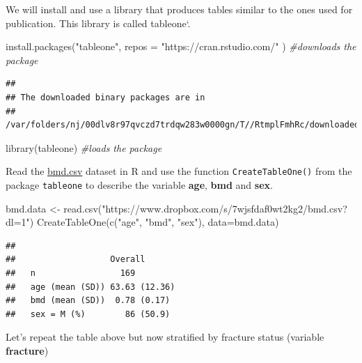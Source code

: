 \documentclass[
]{book}
\newenvironment{Shaded}{\begin{snugshade}}{\end{snugshade}}
\newcommand{\AttributeTok}[1]{\textcolor[rgb]{0.77,0.63,0.00}{#1}}
\newcommand{\CommentTok}[1]{\textcolor[rgb]{0.56,0.35,0.01}{\textit{#1}}}
\newcommand{\FunctionTok}[1]{\textcolor[rgb]{0.00,0.00,0.00}{#1}}
\newcommand{\NormalTok}[1]{#1}
\newcommand{\OtherTok}[1]{\textcolor[rgb]{0.56,0.35,0.01}{#1}}
\newcommand{\StringTok}[1]{\textcolor[rgb]{0.31,0.60,0.02}{#1}}
\begin{document}
We will install and use a library that produces tables similar to the ones used
for publication. This library is called tableone`.

\begin{Shaded}
\begin{Highlighting}[]
\FunctionTok{install.packages}\NormalTok{(}\StringTok{"tableone"}\NormalTok{, }
                 \AttributeTok{repos =} \StringTok{"https://cran.rstudio.com/"}\NormalTok{ ) }\CommentTok{\#downloads the package}
\end{Highlighting}
\end{Shaded}

\begin{verbatim}
## 
## The downloaded binary packages are in
##  /var/folders/nj/00dlv8r97qvczd7trdqw283w0000gn/T//RtmplFmhRc/downloaded_packages
\end{verbatim}

\begin{Shaded}
\begin{Highlighting}[]
\FunctionTok{library}\NormalTok{(tableone)            }\CommentTok{\#loads the package}
\end{Highlighting}
\end{Shaded}

Read the \href{https://www.dropbox.com/s/7wjsfdaf0wt2kg2/bmd.csv?dl=1}{bmd.csv}
dataset in R and use the function \texttt{CreateTableOne()} from the package \texttt{tableone}
to describe the variable \textbf{age}, \textbf{bmd} and \textbf{sex}.

\begin{Shaded}
\begin{Highlighting}[]
\NormalTok{bmd.data }\OtherTok{\textless{}{-}} \FunctionTok{read.csv}\NormalTok{(}\StringTok{"https://www.dropbox.com/s/7wjsfdaf0wt2kg2/bmd.csv?dl=1"}\NormalTok{)}
\FunctionTok{CreateTableOne}\NormalTok{(}\FunctionTok{c}\NormalTok{(}\StringTok{"age"}\NormalTok{, }\StringTok{"bmd"}\NormalTok{, }\StringTok{"sex"}\NormalTok{), }\AttributeTok{data=}\NormalTok{bmd.data)}
\end{Highlighting}
\end{Shaded}

\begin{verbatim}
##                  
##                   Overall      
##   n                 169        
##   age (mean (SD)) 63.63 (12.36)
##   bmd (mean (SD))  0.78 (0.17) 
##   sex = M (%)        86 (50.9)
\end{verbatim}

Let's repeat the table above but now stratified by fracture status (variable
\textbf{fracture})
\end{document}
